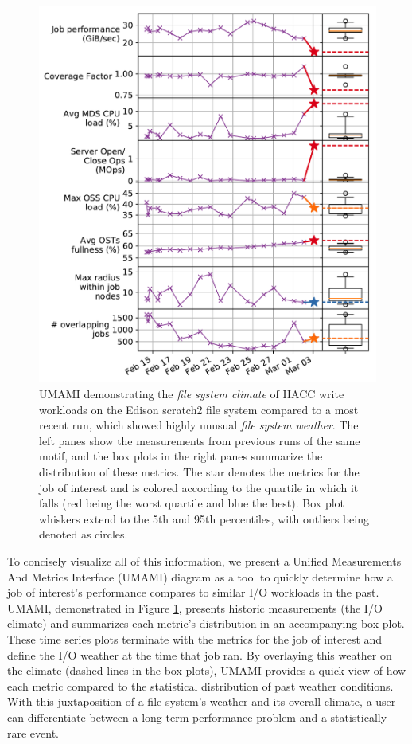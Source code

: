 \begin{figure}[t]
    \centering
    \includegraphics[width=1.0\columnwidth]{figs/umami-scratch2-hacc-write.pdf}
    \caption{UMAMI demonstrating the \emph{file system climate} of HACC write workloads on the Edison scratch2 file system compared to a most recent run, which showed highly unusual \emph{file system weather}.
    The left panes show the measurements from previous runs of the same motif, and the box plots in the right panes summarize the distribution of these metrics.
    The star denotes the metrics for the job of interest and is colored according to the quartile in which it falls (red being the worst quartile and blue the best).
    Box plot whiskers extend to the 5th and 95th percentiles, with outliers being denoted as circles.}
    \label{fig:umami-scratch2-hacc-write}
\vspace{-.2in}
\end{figure}

To concisely visualize all of this information, we present a Unified Measurements And Metrics Interface (UMAMI) diagram as a tool to quickly determine how a job of interest's performance compares to similar I/O workloads in the past.
UMAMI, demonstrated in Figure \ref{fig:umami-scratch2-hacc-write}, presents historic measurements (the I/O climate) and summarizes each metric's distribution in an accompanying box plot.
These time series plots terminate with the metrics for the job of interest and define the I/O weather at the time that job ran.
By overlaying this weather on the climate (dashed lines in the box plots), UMAMI provides a quick view of how each metric compared to the statistical distribution of past weather conditions.
With this juxtaposition of a file system's weather and its overall climate, a user can differentiate between a long-term performance problem and a statistically rare event.%

